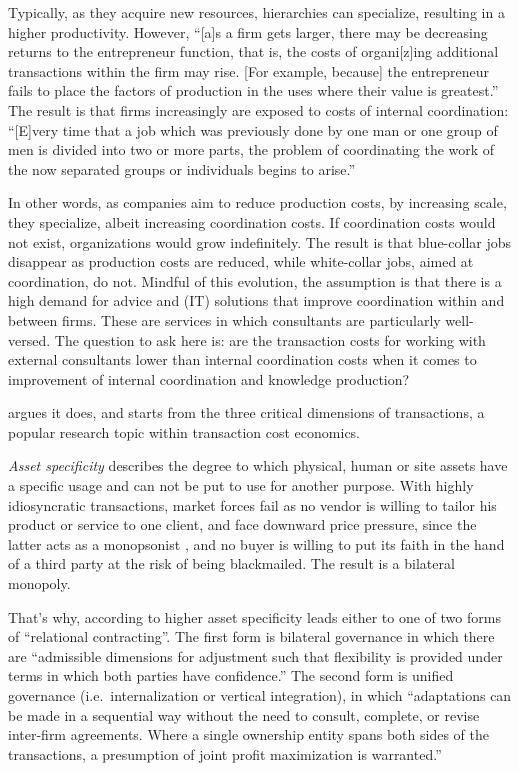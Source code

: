 \documentclass[12pt]{article}
\begin{document}
Typically, as they acquire new resources, hierarchies can specialize,
resulting in a higher productivity. However, ``{[}a{]}s a firm gets
larger, there may be decreasing returns to the entrepreneur function,
that is, the costs of organi{[}z{]}ing additional transactions within
the firm may rise. {[}For example, because{]} the entrepreneur fails to
place the factors of production in the uses where their value is
greatest.'' \citep[ 394-395]{coase1937} The result is that firms
increasingly are exposed to costs of internal coordination:
``{[}E{]}very time that a job which was previously done by one man or
one group of men is divided into two or more parts, the problem of
coordinating the work of the now separated groups or individuals begins
to arise.'' \citep[ 40]{robinson1931}

In other words, as companies aim to reduce production costs, by
increasing scale, they specialize, albeit increasing coordination costs.
If coordination costs would not exist, organizations would grow
indefinitely. The result is that blue-collar jobs disappear as
production costs are reduced, while white-collar jobs, aimed at
coordination, do not. \citep[ 31-32]{canback1998} Mindful of this
evolution, the assumption is that there is a high demand for advice and
(IT) solutions that improve coordination within and between firms. These
are services in which consultants are particularly well-versed. The
question to ask here is: are the transaction costs for working with
external consultants lower than internal coordination costs when it
comes to improvement of internal coordination and knowledge production?

\citet[37-44]{canback1998} argues it does, and starts from the three
critical dimensions of transactions, a popular research topic within
transaction cost economics.

\emph{Asset specificity} describes the degree to which physical, human
or site assets have a specific usage and can not be put to use for
another purpose. With highly idiosyncratic transactions, market forces
fail as no vendor is willing to tailor his product or service to one
client, and face downward price pressure, since the latter acts as a
monopsonist \citep[ 218-228]{robinson1969}, and no buyer is willing to
put its faith in the hand of a third party at the risk of being
blackmailed. The result is a bilateral monopoly. \citep[
63]{williamson1985}

That's why, according to \citet[250-253]{williamson1979} higher asset
specificity leads either to one of two forms of ``relational
contracting''. The first form is bilateral governance in which there are
``admissible dimensions for adjustment such that flexibility is provided
under terms in which both parties have confidence.'' The second form is
unified governance (i.e.~internalization or vertical integration), in
which ``adaptations can be made in a sequential way without the need to
consult, complete, or revise inter-firm agreements. Where a single
ownership entity spans both sides of the transactions, a presumption of
joint profit maximization is warranted.''
\end{document}
